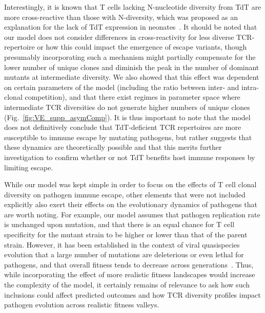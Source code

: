 Interestingly, it is known that T cells lacking N-nucleotide diversity from TdT are more cross-reactive than those with N-diversity, which was proposed as an explanation for the lack of TdT expression in neonates~\cite{gavin1995increased}. It should be noted that our model does not consider differences in cross-reactivity for less diverse TCR-repertoire or how this could impact the emergence of escape variants, though presumably incorporating such a mechanism might partially compensate for the lower number of unique clones and diminish the peak in the number of dominant mutants at intermediate diversity. We also showed that this effect was dependent on certain parameters of the model (including the ratio between inter- and intra-clonal competition), and that there exist regimes in parameter space where intermediate TCR diversities do not generate higher numbers of unique clones (Fig.~\ref{fig:VE_supp_asymComp}). It is thus important to note that the model does not definitively conclude that TdT-deficient TCR repertoires are more susceptible to immune escape by mutating pathogens, but rather suggests that these dynamics are theoretically possible and that this merits further investigation to confirm whether or not TdT benefits host immune responses by limiting escape.

While our model was kept simple in order to focus on the effects of T cell clonal diversity on pathogen immune escape, other elements that were not included explicitly also exert their effects on the evolutionary dynamics of pathogens that are worth noting. For example, our model assumes that pathogen replication rate is unchanged upon mutation, and that there is an equal chance for T cell specificity for the mutant strain to be higher or lower than that of the parent strain. However, it has been established in the context of viral quasispecies evolution that a large number of mutations are deleterious or even lethal for pathogens, and that overall fitness tends to decrease across generations~\cite{bergstrom1999transmission,peck2018complexities,wylie2011biophysical}. Thus, while incorporating the effect of more realistic fitness landscapes would increase the complexity of the model, it certainly remains of relevance to ask how such inclusions could affect predicted outcomes and how TCR diversity profiles impact pathogen evolution across realistic fitness valleys.

